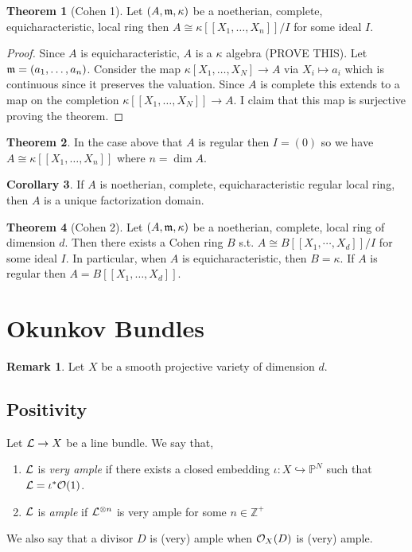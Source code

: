 \documentclass[12pt]{extarticle}
\newcommand{\Z}{\mathbb{Z}}
\theoremstyle{definition}
\newtheorem{theorem}{Theorem}[section]
\newtheorem{corollary}[theorem]{Corollary}
\newtheorem{remark}{Remark}
\newenvironment{definition}[1][Definition:]{\begin{trivlist}
\item[\hskip \labelsep {\bfseries #1}]}{\end{trivlist}}
\begin{document}
\begin{theorem}[Cohen 1]
Let $(A, \mathfrak{m}, \kappa)$ be a noetherian, complete, equicharacteristic, local ring then $A \cong \kappa[[X_1, \dots, X_n]] / I$ for some ideal $I$.
\end{theorem}

\begin{proof}
Since $A$ is equicharacteristic, $A$ is a $\kappa$ algebra (PROVE THIS).
Let $\mathfrak{m} = (a_1, \dots, a_n)$. Consider the map $\kappa[X_1, \dots, X_N] \to A$ via $X_i \mapsto a_i$ which is continuous since it preserves the valuation. Since $A$ is complete this extends to a map on the completion $\kappa[[X_1, \dots, X_N]] \to A$. I claim that this map is surjective proving the theorem.  
\end{proof}

\begin{theorem}
In the case above that $A$ is regular then $I = (0)$ so we have $A \cong \kappa[[X_1, \dots, X_n]]$ where $n = \dim{A}$.  
\end{theorem}

\begin{corollary}
If $A$ is noetherian, complete, equicharacteristic regular local ring, then $A$ is a unique factorization domain.
\end{corollary}

\begin{theorem}[Cohen 2]
Let $(A, \mathfrak{m}, \kappa)$ be a noetherian, complete, local ring of dimension $d$. Then there exists a Cohen ring $B$ s.t. $A \cong B[[X_1, \cdots, X_d]] / I$ for some ideal $I$.
In particular, when $A$ is equicharacteristic, then $B = \kappa$. If $A$ is regular then $A = B[[X_1, \dots, X_d]]$. 
\end{theorem}

\section{Okunkov Bundles}

\begin{remark}
Let $X$ be a smooth projective variety of dimension $d$. 
\end{remark}

\subsection{Positivity}


\begin{definition}
Let $\mathcal{L} \to X$ be a line bundle. We say that,
\begin{enumerate}
\item $\mathcal{L}$ is \textit{very ample} if there exists a closed embedding $\iota : X \hookrightarrow \mathbb{P}^N$ such that $\mathcal{L} = \iota^* \mathcal{O}(1)$. 
\item $\mathcal{L}$ is \textit{ample} if $\mathcal{L}^{\otimes n}$ is very ample for some $n \in \Z^{+}$
\end{enumerate}
We also say that a divisor $D$ is (very) ample when $\mathcal{O}_{X}(D)$ is (very) ample. 
\end{definition}
\end{document}
